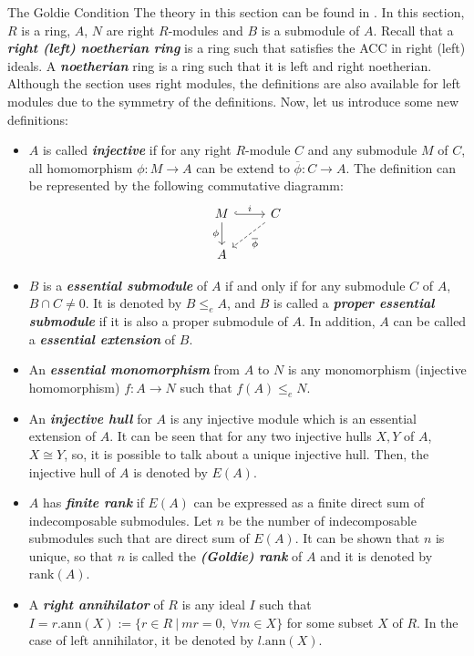 \documentclass[final]{beamer}
\newlength{\colwidth}
\newcommand{\essentialeq}{\leq_e}
\newcommand{\rank}{\mathrm{rank}}
\newcommand{\defi}[1]{\textbf{\textsl{#1}}}
\newcommand{\ann}{\mathrm{ann}}
\begin{document}
\begin{frame}[t, fragile]
\begin{columns}[t]
\begin{column}{\colwidth}
 \begin{block}{The Goldie Condition}
    The theory in this section can be found in \textbf{\cite{goodearl_warfield}}. In this section, $R$ is a ring, $A$, $N$ are right $R$-modules and $B$ is a submodule of $A$. Recall that a \defi{right (left) noetherian ring} is a ring such that satisfies the ACC in right (left) ideals. A \defi{noetherian} ring is a ring such that it is left and right noetherian. Although the section uses right modules, the definitions are also available for left modules due to the symmetry of the definitions. Now, let us introduce some new definitions:
    \begin{itemize}
        \item $A$ is called \defi{injective} if for any right $R$-module $C$ and any submodule $M$ of $C$, all homomorphism $\phi:M\to A$ can be extend to $\overline{\phi}:C\to A$. The definition can be represented by the following commutative diagramm:
        \begin{equation*}
            \begin{tikzcd}
                M \arrow[hook]{r}{i}\arrow[swap]{d}{\phi}
            & C \arrow[dashed]{ld}{\overline{\phi}}\\
            A &
            \end{tikzcd}
        \end{equation*}
        \item $B$ is a \defi{essential submodule} of $A$ if and only if for any submodule $C$ of $A$, $B\cap C\neq 0$. It is denoted by $B\essentialeq A$, and $B$ is called a \defi{proper essential submodule} if it is also a proper submodule of $A$. In addition, $A$ can be called a \defi{essential extension} of $B$.
        \item An \defi{essential monomorphism} from $A$ to $N$ is any monomorphism (injective homomorphism) $f:A\to N$ such that $f(A)\essentialeq N$.
        \item An \defi{injective hull} for $A$ is any injective module which is an essential extension of $A$. It can be seen that for any two injective hulls $X,Y$ of $A$, $X\cong Y$, so, it is possible to talk about a unique injective hull. Then, the injective hull of $A$ is denoted by $E(A)$.
        \item $A$ has \defi{finite rank} if $E(A)$ can be expressed as a finite direct sum of indecomposable submodules. Let $n$ be the number of indecomposable submodules such that are direct sum of $E(A)$. It can be shown that $n$ is unique, so that $n$ is called the \defi{(Goldie) rank} of $A$ and it is denoted by $\rank(A)$.
        \item A \defi{right annihilator} of $R$ is any ideal $I$ such that $I=r.\ann(X):=\{r\in R ~|~mr=0,~\forall m\in X\}$ for some subset $X$ of $R$. In the case of left annihilator, it be denoted by $l.\ann(X)$.
    \end{itemize}
  \end{block}


\end{column}
\end{columns}
\end{frame}
\end{document}
